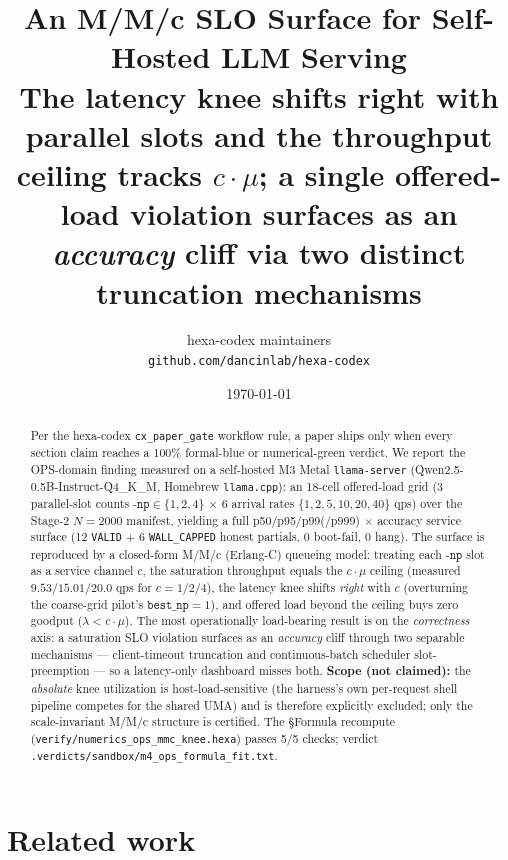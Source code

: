 \documentclass[11pt,a4paper]{article}
\title{
  \textbf{An M/M/c SLO Surface for Self-Hosted LLM Serving}\\[4pt]
  \large The latency knee shifts right with parallel slots and the throughput
  ceiling tracks \(c\cdot\mu\); a single offered-load violation surfaces as an
  \emph{accuracy} cliff via two distinct truncation mechanisms
}
\author{hexa-codex maintainers \\ \texttt{github.com/dancinlab/hexa-codex}}
\date{\today}
\begin{document}
\maketitle

\begin{abstract}
Per the hexa-codex \texttt{cx\_paper\_gate} workflow rule, a paper ships only
when every section claim reaches a 100\% formal-blue or numerical-green verdict.
We report the OPS-domain finding measured on a self-hosted M3 Metal
\texttt{llama-server} (Qwen2.5-0.5B-Instruct-Q4\_K\_M, Homebrew
\texttt{llama.cpp}): an 18-cell offered-load grid (3 parallel-slot counts
\(\texttt{-np}\in\{1,2,4\}\) \(\times\) 6 arrival rates
\(\{1,2,5,10,20,40\}\) qps) over the Stage-2 \(N{=}2000\) manifest, yielding a
full p50/p95/p99(/p999) \(\times\) accuracy service surface (12 \texttt{VALID}
\(+\) 6 \texttt{WALL\_CAPPED} honest partials, 0 boot-fail, 0 hang). The surface
is reproduced by a closed-form M/M/c (Erlang-C) queueing model: treating each
\(\texttt{-np}\) slot as a service channel \(c\), the saturation throughput
equals the \(c\cdot\mu\) ceiling (measured \(9.53/15.01/20.0\) qps for
\(c{=}1/2/4\)), the latency knee shifts \emph{right} with \(c\) (overturning the
coarse-grid pilot's \(\texttt{best\_np}{=}1\)), and offered load beyond the
ceiling buys zero goodput (\(\lambda < c\cdot\mu\)). The most operationally
load-bearing result is on the \emph{correctness} axis: a saturation SLO
violation surfaces as an \emph{accuracy} cliff through two separable mechanisms
--- client-timeout truncation and continuous-batch scheduler slot-preemption ---
so a latency-only dashboard misses both. \textbf{Scope (not claimed):} the
\emph{absolute} knee utilization is host-load-sensitive (the harness's own
per-request shell pipeline competes for the shared UMA) and is therefore
explicitly excluded; only the scale-invariant M/M/c structure is certified.
The \S Formula recompute (\texttt{verify/numerics\_ops\_mmc\_knee.hexa}) passes
5/5 checks; verdict \texttt{.verdicts/sandbox/m4\_ops\_formula\_fit.txt}.
\end{abstract}

\section{Related work}
\label{sec:related}
\end{document}
